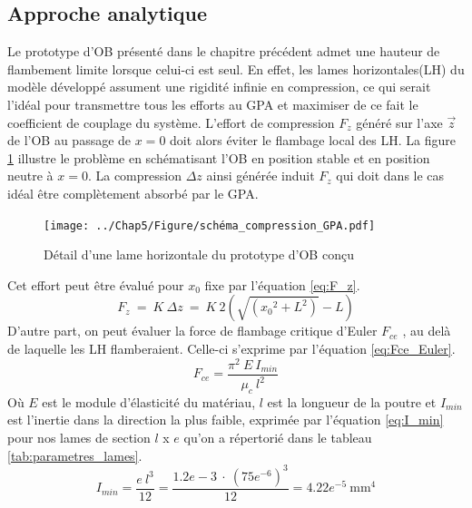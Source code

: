 	\subsection{Approche analytique}
	\label{sec:3.3.1_Approche analytique flambement LH}
Le prototype d'OB présenté dans le chapitre précédent admet une hauteur de flambement limite lorsque celui-ci est seul. En effet, les lames horizontales(LH) du modèle développé assument une rigidité infinie en compression, ce qui serait l'idéal pour transmettre tous les efforts au GPA et maximiser de ce fait le coefficient de couplage du système. L'effort de compression $F_z$ généré sur l'axe $\vec{z}$ de l'OB au passage de $x=0$ doit alors éviter le flambage local des LH. La figure \ref{fig:schema_compression_GPA} illustre le problème en schématisant l'OB en position stable et en position neutre à $x=0$. La compression $\Delta z$ ainsi générée induit $F_z$ qui doit dans le cas idéal être complètement absorbé par le GPA.
\begin{figure}[!htb]
\begin{center}
    \captionsetup{justification=centering}
	\texttt{[image: ../Chap5/Figure/schéma\_compression\_GPA.pdf]}
	\caption{Détail d'une lame horizontale du prototype d'OB conçu}
	\label{fig:schema_compression_GPA}
\end{center}	
\end{figure}    
Cet effort peut être évalué pour $x_0$ fixe par l'équation \ref{eq:F_z}.
\begin{equation}
	F_z\ =\ K\ \Delta z\ =\  K\ 2(\sqrt{({x_0}^2+L^2)} - L)
	\label{eq:F_z}
\end{equation}  
D'autre part, on peut évaluer la force de flambage critique d'Euler $F_{ce}$ \cite{Bourahla2011}, au delà de laquelle les LH flamberaient. Celle-ci s'exprime par l'équation \ref{eq:Fce_Euler}.
\begin{equation}
	F_{ce} = \dfrac{{\pi}^2\ E\ I_{min}}{\mu_c\ l^2}
	\label{eq:Fce_Euler}
\end{equation}
Où $E$ est le module d'élasticité du matériau, $l$ est la longueur de la poutre et $I_{min}$ est l'inertie dans la direction la plus faible, exprimée par l'équation \ref{eq:I_min} pour nos lames de section $l$ x $e$ qu'on a répertorié dans le tableau \ref{tab:parametres_lames}.
\begin{equation}
	I_{min} = \dfrac{e\ l^3}{12} = \dfrac{1.2{e-3}\ \cdot\ {(75e^{-6})}^3}{12} = 4.22e^{-5}\ \text{mm}^4
	\label{eq:I_min}
\end{equation}

